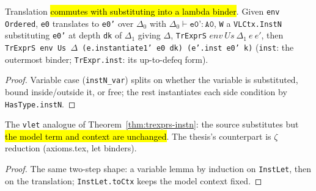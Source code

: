 \begin{theorem}
\label{thm:trexprs-instn}
\leanok
{}
 

 Translation \hl{commutes with substituting into a lambda binder}. Given \texttt{env} \texttt{Ordered}, \texttt{e0} translates to \texttt{e0'} over $\Delta_0$ with $\Delta_0 \vdash \texttt{e0'} : \texttt{A0}$, \texttt{W} a \texttt{VLCtx.InstN} substituting \texttt{e0'} at depth \texttt{dk} of $\Delta_1$ giving $\Delta$, \texttt{TrExprS} $env\ Us\ \Delta_1\ e\ e'$, then \texttt{TrExprS env Us $\Delta$ (e.instantiate1' e0 dk) (e'.inst e0' k)} (\texttt{inst}: the outermost binder; \texttt{TrExpr.inst}: its up-to-defeq form).
\end{theorem}
\begin{proof}
\leanok
{} Variable case (\texttt{instN\_var}) splits on whether the variable is substituted, bound inside/outside it, or free; the rest instantiates each side condition by \texttt{HasType.instN}.
\end{proof}

\begin{theorem}
\label{thm:trexprs-instlet}
\leanok
{}
 The \texttt{vlet} analogue of Theorem~\ref{thm:trexprs-instn}: the source substitutes but \hl{the model term and context are unchanged}. The thesis's counterpart is $\zeta$ reduction (axioms.tex, let binders).
\end{theorem}
\begin{proof}
\leanok
{} The same two-step shape: a variable lemma by induction on \texttt{InstLet}, then on the translation; \texttt{InstLet.toCtx} keeps the model context fixed.
\end{proof}

